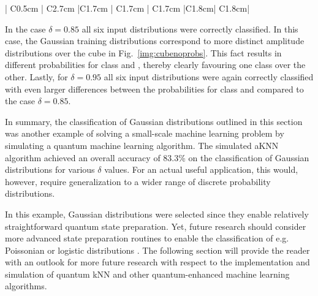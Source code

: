 \begin{table}[H]
\begin{tabular}{| C{0.5cm} | C{2.7cm} |C{1.7cm} | C{1.7cm} | C{1.7cm} |C{1.8cm}| C{1.8cm}|}
      \bottomrule
    \end{tabular}
    \caption{\label{tab:gauss3qubitresults} Amplitude-based kNN algorithm classification results after 1000 runs for various Gaussian distributions centered around six different three-qubit patterns. The Gaussian distributions were created using the coin gate $C(\delta)$. For each pattern three different distributions were prepared and classified by changing the parameter $\delta$: The results for $\delta = 0.6$ are always on top and marked with an empty circle ($\circ$), results for $\delta = 0.85$ are always in the middle marked with a filled circle ($\bullet$) and results for $\delta = 0.95$ are always at the bottom and marked with a triangle ($\triangleright$)}
\end{table}

In the case $\delta = 0.85$ all six input distributions were correctly classified. In this case, the Gaussian training distributions correspond to more distinct amplitude distributions over the cube in Fig.~\ref{img:cubenoprobs}. This fact results in different probabilities for class \0 and \1, thereby clearly favouring one class over the other. Lastly, for $\delta = 0.95$ all six input distributions were again correctly classified with even larger differences between the probabilities for class \0 and \1 compared to the case $\delta = 0.85$.

In summary, the classification of Gaussian distributions outlined in this section was another example of solving a small-scale machine learning problem by simulating a quantum machine learning algorithm. The simulated aKNN algorithm achieved an overall accuracy of 83.3\% on the classification of Gaussian distributions for various $\delta$ values. For an actual useful application, this would, however, require generalization to a wider range of discrete probability distributions. 

In this example, Gaussian distributions were selected since they enable relatively straightforward quantum state preparation. Yet, future research should consider more advanced state preparation routines to enable the classification of e.g. Poissonian or logistic distributions \cite{Grover2002,soklakov2006efficient}. The following section will provide the reader with an outlook for more future research with respect to the implementation and simulation of quantum kNN and other quantum-enhanced machine learning algorithms.




